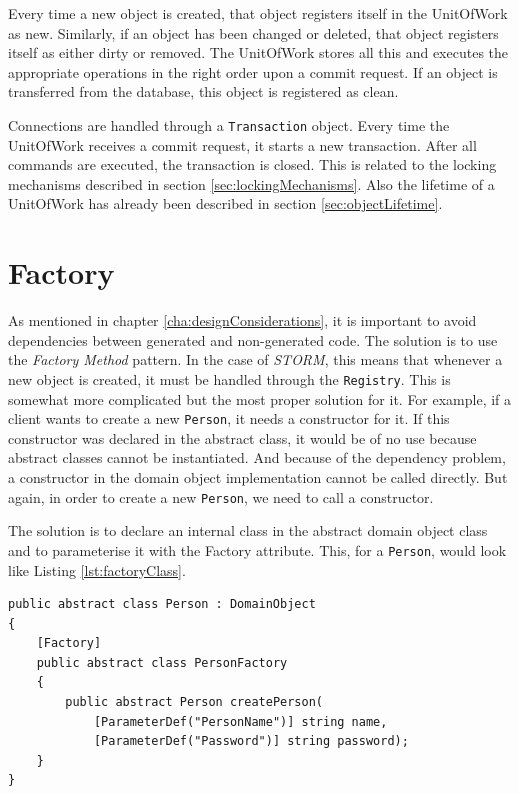 		Every time a new object is created, that object registers itself in the UnitOfWork as new.
		Similarly, if an object has been changed or deleted, that object registers itself as either
		dirty or removed.
		The UnitOfWork stores all this and executes the appropriate operations in the right order upon
		a commit request. If an object is transferred from the database, this object is registered as
		clean.
		
		Connections are handled through a \verb~Transaction~ object. Every time the UnitOfWork
		receives a commit request, it starts a new transaction. After all commands are executed,
		the transaction is closed. This is related to the locking mechanisms described in 
		section \ref{sec:lockingMechanisms}. Also the lifetime of a UnitOfWork has already been
		described in section \ref{sec:objectLifetime}.
		
	\section{Factory}
	\label{sec:Factory}
		As mentioned in chapter \ref{cha:designConsiderations}, it is important to avoid dependencies
		between generated and non-generated code. The solution is to use the \textit{Factory Method} pattern.
		In the case of \textit{STORM}, this means that whenever a new object is created, it must be 
		handled through the \verb~Registry~. This is somewhat more complicated but the most proper
		solution for it. For example, if a client wants to create a new \verb~Person~, it needs a
		constructor for it. If this constructor was declared in the abstract class, it would be
		of no use because abstract classes cannot be instantiated. And because of the dependency
		problem, a constructor in the domain object implementation cannot be called directly. But again, in order
		to create a new \verb~Person~, we need to call a constructor.
		
		The solution is to declare an internal class in the abstract domain object class and to parameterise
		it with the Factory attribute. This, for a \verb~Person~, would look like Listing
		\ref{lst:factoryClass}.
		
		\begin{lstlisting}[float=htb,language={[Sharp]C},caption=Defining a Factory Class,
		label=lst:factoryClass]
public abstract class Person : DomainObject
{
	[Factory]
	public abstract class PersonFactory
	{
		public abstract Person createPerson(
			[ParameterDef("PersonName")] string name,
			[ParameterDef("Password")] string password);
	}
}
		\end{lstlisting}
		
